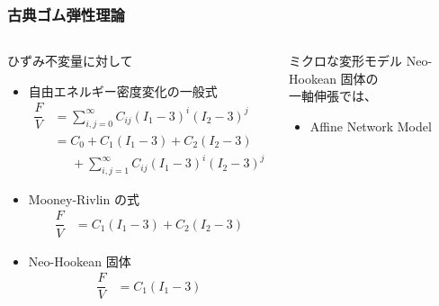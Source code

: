 \documentclass[12pt, dvipdfmx]{beamer}
\begin{document}
\begin{frame}
    \frametitle{古典ゴム弾性理論}
        \vspace{-6mm}
        \begin{columns}[T, onlytextwidth]
                \begin{block}{ひずみ不変量に対して}
                    \begin{itemize}
                        \item 自由エネルギー密度変化の一般式
                        \vspace{-3mm}
                        \scriptsize
                        \begin{align*}
                            \dfrac{F}{V} &= \sum_{i,j = 0}^{\infty} C_{ij}(I_1-3)^i(I_2-3)^j \\
                            &= C_0 + C_1 (I_1-3) + C_2(I_2-3) \\
                            &\;\;\;\;\;+ \sum_{i,j = 1}^{\infty} C_{ij}(I_1-3)^i(I_2-3)^j
                        \end{align*}
                        \normalsize
                        \item Mooney-Rivlin の式
                        \vspace{-3mm}
                        \scriptsize
                        \begin{align*}
                            \dfrac{F}{V} &= C_1 (I_1-3) + C_2(I_2-3)
                        \end{align*}
                        \normalsize
                        \item Neo-Hookean 固体
                        \vspace{-3mm}
                        \scriptsize
                        \begin{align*}
                            \dfrac{F}{V} &= C_1 (I_1-3)
                        \end{align*}
                        \normalsize
                    \end{itemize}
                \end{block}
                \begin{exampleblock}{ミクロな変形モデル}
                    Neo-Hookean 固体の\\一軸伸張では、
                    \begin{itemize}
                        \item Affine Network Model

\end{itemize}
\end{exampleblock}
\end{columns}
\end{frame}
\end{document}
